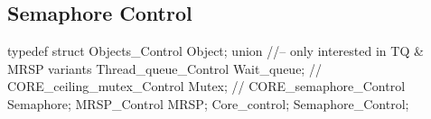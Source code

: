 \newpage
\subsection{Semaphore Control}

\begin{nicec}
typedef struct {
  Objects_Control          Object;
  union {  //-- only interested in TQ & MRSP variants
    Thread_queue_Control Wait_queue;
    // CORE_ceiling_mutex_Control Mutex;
    // CORE_semaphore_Control Semaphore;
    MRSP_Control MRSP;
  } Core_control;
}   Semaphore_Control;
\end{nicec}
